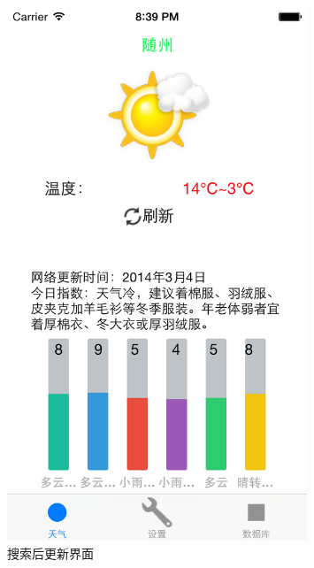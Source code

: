 \documentclass[UTF8,nofonts]{ctexart}
\begin{document}
\begin{figure}[hbt]
\centering
\includegraphics[width=0.8\textwidth]{6.png}
\caption{搜索后更新界面}
\end{figure}
\end{document}
